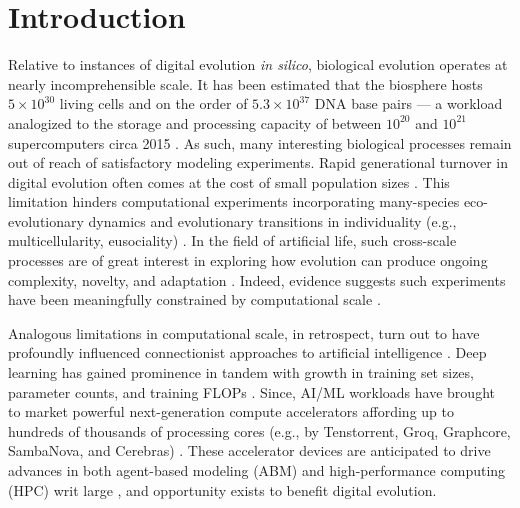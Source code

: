 \section{Introduction}
\label{moreno:sec:introduction}
\vspace{-2.0ex}

Relative to instances of digital evolution \textit{in silico}, biological evolution operates at nearly incomprehensible scale.
It has been estimated that the biosphere hosts $5 \times 10^{30}$ living cells and on the order of $5.3 \times 10^{37}$ DNA base pairs --- a workload analogized to the storage and processing capacity of between $10^{20}$ and $10^{21}$ supercomputers circa 2015 \cite{Landenmark2015}.
As such, many interesting biological processes remain out of reach of satisfactory modeling experiments.
Rapid generational turnover in digital evolution often comes at the cost of small population sizes \cite{moreno2022engineering}.
This limitation hinders computational experiments incorporating many-species eco-evolutionary dynamics and evolutionary transitions in individuality (e.g., multicellularity, eusociality) \cite{penczykowski2016understanding,alizon2012modelling,schreiber2021cross}.
In the field of artificial life, such cross-scale processes are of great interest in exploring how evolution can produce ongoing complexity, novelty, and adaptation \cite{taylor2016open,dolson2021digital,taylor2019evolutionary,ackley2014indefinitely}.
Indeed, evidence suggests such experiments have been meaningfully constrained by computational scale \cite{channon2019maximum}.

Analogous limitations in computational scale, in retrospect, turn out to have profoundly influenced connectionist approaches to artificial intelligence \cite{kaplan2020scaling}.
Deep learning has gained prominence in tandem with growth in training set sizes, parameter counts, and training FLOPs \cite{marcus2018deep}.
Since, AI/ML workloads have brought to market powerful next-generation compute accelerators affording up to hundreds of thousands of processing cores (e.g., by Tenstorrent, Groq, Graphcore, SambaNova, and Cerebras) \cite{zhang2016cambricon,emani2021accelerating,jia2019dissecting,medina2020habana}.
These accelerator devices are anticipated to drive advances in both agent-based modeling (ABM) and high-performance computing (HPC) writ large \cite{perumalla2022computer,VanEssendelft2025}, and opportunity exists to benefit digital evolution.

